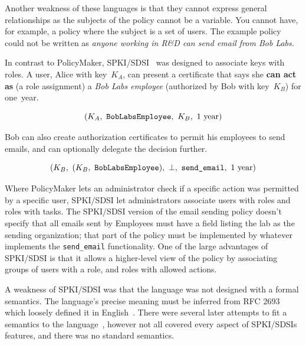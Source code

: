 \documentclass[thesis.tex]{subfiles}
\begin{document}
Another weakness of these languages is that they cannot express
general relationships as the subjects of the policy cannot be a
variable.  You cannot have, for example, a policy where the subject is
a set of users.  The example policy could not be written as
\emph{anyone working in R\&D can send email from Bob Labs.}


In contrast to PolicyMaker, SPKI/SDSI~\cite{ellison_spki_1999} was
designed to associate keys with roles.  A user, Alice with key~$K_A$,
can present a certificate that says she \textbf{can act as} (a role assignment) a \emph{Bob Labs
employee} (authorized by Bob with key~$K_B$) for one~year.

\begin{equation*}
  (K_A,~\text{\tt BobLabsEmployee},~K_B,~1~\text{year})
\end{equation*}

Bob can also create authorization certificates to permit his employees
to send emails, and can optionally delegate the decision further.

\begin{equation*}
 (K_B,~(K_B,~\text{\tt BobLabsEmployee}),~\bot,~\text{\ttfamily send\_email},~1~\text{year})
\end{equation*}

Where PolicyMaker lets an administrator check if a specific action was permitted
by a specific user, SPKI/SDSI let administrators associate users with roles and
roles with tasks. The SPKI/SDSI version of the email sending policy doesn't
specify that all emails sent by Employees must have a field listing the lab as
the sending organization; that part of the policy must be implemented by
whatever implements the \texttt{send\_email} functionality. One of the large
advantages of SPKI/SDSI is that it allows a higher-level view of the policy by
associating groups of users with a role, and roles with allowed actions.

A weakness of SPKI/SDSI was that the language was not designed
with a formal semantics.  The language's precise meaning must be inferred from
RFC 2693 which loosely defined it in English~\cite{ellison_spki_1999}. There were
several later attempts to fit a semantics to the
language~\cite{joseph_y._halpern_logic_1999,abadi_sdsis_1998,howell_formal_2000,dwaine_clarke_certificate_2001},
however not all covered every aspect of SPKI/SDSIs features, and there was no standard semantics.
\end{document}
